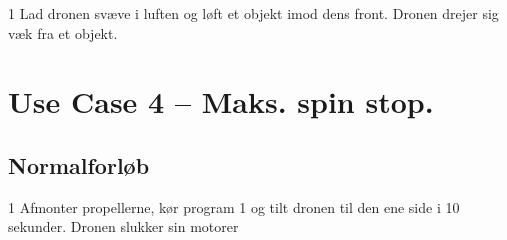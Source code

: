 \documentclass[Main]{subfiles}
\begin{document}
\begin{TestCaseIntro}
\end{TestCaseIntro}

\begin{TestCase}
\TC
{1}
{Lad dronen svæve i luften og løft et objekt imod dens front.}
{Dronen drejer sig væk fra et objekt.}

\end{TestCase}






\newpage
\section{Use Case 4 -- Maks. spin stop.}
\subsection*{Normalforløb}

\begin{TestCaseIntro}
\end{TestCaseIntro}

\begin{TestCase}
\TC
{1}
{Afmonter propellerne, kør program 1 og tilt dronen til den ene side i 10 sekunder.}
{Dronen slukker sin motorer}
{}
\end{TestCase}
\end{document}
